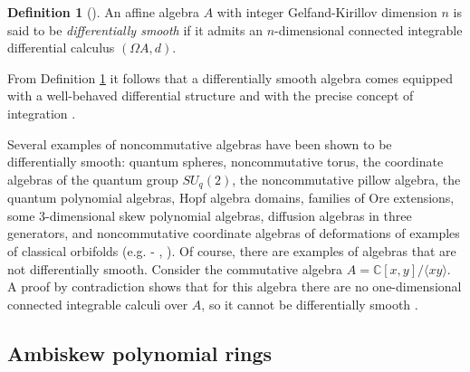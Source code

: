 \documentclass{amsart}
\theoremstyle{definition}
\newtheorem{definition}[theorem]{Definition}
\theoremstyle{remark}
\numberwithin{equation}{section}
\begin{document}
\begin{definition}[{\cite[Definition 2.4]{BrzezinskiSitarz2017}}]\label{BrzezinskiSitarz2017Definition2.4}
An affine algebra $A$ with integer Gelfand-Kirillov dimension $n$ is said to be {\em differentially smooth} if it admits an $n$-dimensional connected integrable differential calculus $(\Omega A, d)$.
\end{definition}

From Definition \ref{BrzezinskiSitarz2017Definition2.4} it follows that a differentially smooth algebra comes equipped with a well-behaved differential structure and with the precise concept of integration \cite[p. 2414]{BrzezinskiLomp2018}.

Several examples of noncommutative algebras have been shown to be differentially smooth: quantum spheres, noncommutative torus, the coordinate algebras of the quantum group $SU_q(2)$, the noncommutative pillow algebra, the quantum polynomial algebras, Hopf algebra domains, families of Ore extensions, some 3-dimensional skew polynomial algebras, diffusion algebras in three generators, and noncommutative coordinate algebras of deformations of examples of classical orbifolds (e.g. \cite{Brzezinski2014} - \cite{BrzezinskiSitarz2017}, \cite{DuboisViolette1988, DuboisVioletteKernerMadore1990, Karacuha2015, KaracuhaLomp2014, ReyesSarmiento2022}). Of course, there are examples of algebras that are not differentially smooth. Consider the commutative algebra $A = \mathbb{C}[x, y] / \langle xy \rangle$. A proof by contradiction shows that for this algebra there are no one-dimensional connected integrable calculi over $A$, so it cannot be differentially smooth \cite[Example 2.5]{BrzezinskiSitarz2017}.


\subsection{Ambiskew polynomial rings}
\end{document}
